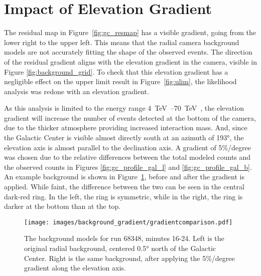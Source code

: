  \FloatBarrier

\section{Impact of Elevation Gradient}\label{sec:elevgradient}

  The residual map in Figure~\ref{fig:gc_resmap} has a visible gradient, going from the lower right to the upper left.
  This means that the radial camera background models are not accurately fitting the shape of the observed events.
  The direction of the residual gradient aligns with the elevation gradient in the camera, visible in Figure \ref{fig:background_grid}.
  To check that this elevation gradient has a negligible effect on the upper limit result in Figure~\ref{fig:ulim}, the likelihood analysis was redone with an elevation gradient.
  
  As this analysis is limited to the energy range \SIrange{4}{70}{\TeV{}}, the elevation gradient will increase the number of events detected at the bottom of the camera, due to the thicker atmosphere providing increased interaction mass.
  And, since the Galactic Center is visible almost directly south at an azimuth of \ang{193}, the elevation axis is almost parallel to the declination axis.
  A gradient of 5\%/degree was chosen due to the relative differences between the total modeled counts and the observed counts in Figures \ref{fig:gc_profile_gal_l} and \ref{fig:gc_profile_gal_b}.
  An example background is shown in Figure~\ref{fig:bkg_flatvsgrad}, before and after the gradient is applied.
  While faint, the difference between the two can be seen in the central dark-red ring.
  In the left, the ring is symmetric, while in the right, the ring is darker at the bottom than at the top.
  
  \begin{figure}[ht]
    \centering
    \texttt{[image: images/background\_gradient/gradientcomparison.pdf]}
    \caption[Background Gradient Comparison]{
      The background models for run 68348, minutes 16-24.
      Left is the original radial background, centered \ang{0.5} north of the Galactic Center.
      Right is the same background, after applying the 5\%/degree gradient along the elevation axis.
    }
    \label{fig:bkg_flatvsgrad}
  \end{figure}
  
